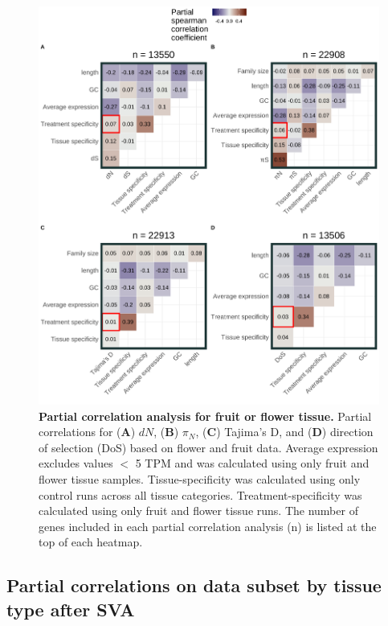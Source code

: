 \documentclass[12pt]{article}
\begin{document}
\begin{figure}[H]
\centering
\includegraphics[width = \linewidth]{figures/appendix_a/partialCorrelations_withTissueSpecificity_fruitORflower_2023-02-20.pdf}
\caption{\textbf{Partial correlation analysis for fruit or flower tissue.} Partial correlations for (\textbf{A}) $dN$, (\textbf{B}) $\pi_N$, (\textbf{C}) Tajima's D, and (\textbf{D}) direction of selection (DoS) based on flower and fruit data. Average expression excludes values $<$ 5 TPM and was calculated using only fruit and flower tissue samples. Tissue-specificity was calculated using only control runs across all tissue categories. Treatment-specificity was calculated using only fruit and flower tissue runs. The number of genes included in each partial correlation analysis (n) is listed at the top of each heatmap.}%
\end{figure}

\subsection*{Partial correlations on data subset by tissue type after SVA}
\end{document}

